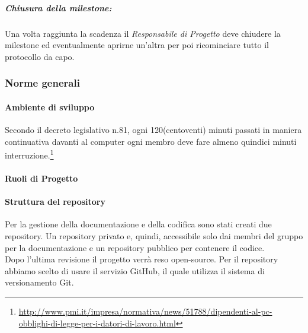 		\subparagraph{Chiusura della milestone:}
		
		Una volta raggiunta la scadenza il \textit{Responsabile di Progetto} deve chiudere la \gls{milestone} ed eventualmente aprirne un'altra per poi ricominciare tutto il protocollo da capo.

\newpage
\subsubsection{Norme generali}
	\paragraph{Ambiente di sviluppo}
	Secondo il decreto legislativo n.81, ogni 120(centoventi) minuti passati in maniera continuativa davanti al computer ogni membro deve fare almeno quindici minuti interruzione.\footnote{\url{http://www.pmi.it/impresa/normativa/news/51788/dipendenti-al-pc-obblighi-di-legge-per-i-datori-di-lavoro.html}}

	\paragraph{Ruoli di Progetto}
	
	
\newpage
	\paragraph{Struttura del repository} \label{repository}
	Per la gestione della documentazione e della codifica sono stati creati due \gls{repository}. Un \gls{repository} privato e, quindi, accessibile solo dai membri del gruppo \GRUPPO{} per la documentazione e un \gls{repository} pubblico per contenere il codice.\\
	Dopo l'ultima revisione il progetto verrà reso open-source.
	Per il \gls{repository} abbiamo scelto di usare il servizio \gls{GitHub}, il quale utilizza il sistema di \gls{versionamento} \gls{Git}.
	

